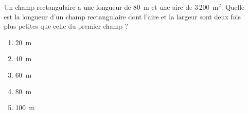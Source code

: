 Un champ rectangulaire a une longueur de 80~m et une aire de 3\,200~m$^2$. Quelle est la longueur d'un champ rectangulaire dont l'aire et la largeur sont deux fois plus petites que celle du premier champ ?
\begin{multicols}{5}
  \begin{enumerate}[A/]
  \item 20~m
  \item 40~m
  \item 60~m
  \item 80~m
  \item 100~m
  \end{enumerate}
\end{multicols}